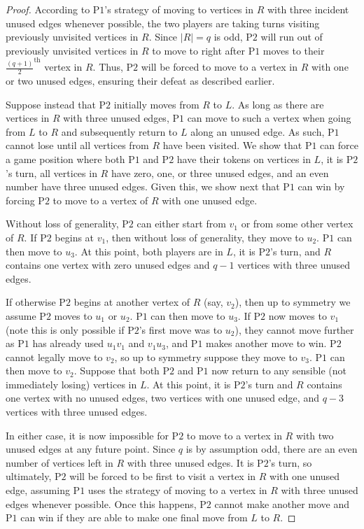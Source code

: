 \documentclass{article}
\theoremstyle{plain}
\theoremstyle{definition}
\def\pone{{\rm{P}\ensuremath{1}}}
\def\ptwo{{\rm{P}\ensuremath{2}}}
\def\ptwoposs{{\rm{P}\ensuremath{2}'s}}
\begin{document}
\begin{proof}
According to \pone{}'s strategy of moving to vertices in $R$ with three incident unused edges whenever possible, the two players are taking turns visiting previously unvisited vertices in $R$. Since $|R| = q$ is odd, \ptwo{} will run out of previously unvisited vertices in $R$ to move to right after \pone{} moves to their $\frac{(q+1)}{2}^{\text{th}}$ vertex in $R$. Thus, \ptwo{} will be forced to move to a vertex in $R$ with one or two unused edges, ensuring their defeat as described earlier.

Suppose instead that \ptwo{} initially moves from $R$ to $L$. As long as there are vertices in $R$ with three unused edges, \pone{} can move to such a vertex when going from $L$ to $R$ and subsequently return to $L$ along an unused edge. As such, \pone{} cannot lose until all vertices from $R$ have been visited. We show that \pone{} can force a game position where both \pone{} and \ptwo{} have their tokens on vertices in $L$, it is \ptwoposs{} turn, all vertices in $R$ have zero, one, or three unused edges, and an even number have three unused edges. Given this, we show next that \pone{} can win by forcing \ptwo{} to move to a vertex of $R$ with one unused edge. 

Without loss of generality, \ptwo{} can either start from $v_1$ or from some other vertex of $R$. If \ptwo{} begins at $v_1$, then without loss of generality, they move to $u_2$. \pone{} can then move to $u_3$. At this point, both players are in $L$, it is \ptwoposs{} turn, and $R$ contains one vertex with zero unused edges and $q-1$ vertices with three unused edges.  

If otherwise \ptwo{} begins at another vertex of $R$ (say, $v_2$), then up to symmetry we assume \ptwo{} moves to $u_1$ or $u_2$. \pone{} can then move to $u_3$. If \ptwo{} now moves to $v_1$ (note this is only possible if \ptwoposs{} first move was to $u_2$), they cannot move further as \pone{} has already used $u_1v_1$ and $v_1u_3$, and \pone{} makes another move to win. \ptwo{} cannot legally move to $v_2$, so up to symmetry suppose they move to $v_3$. \pone{} can then move to $v_2$. Suppose that both \ptwo{} and \pone{} now return to any sensible (not immediately losing) vertices in $L$. At this point, it is \ptwoposs{} turn and $R$ contains one vertex with no unused edges, two vertices with one unused edge, and $q-3$ vertices with three unused edges. 

In either case, it is now impossible for \ptwo{} to move to a vertex in $R$ with two unused edges at any future point. Since $q$ is by assumption odd, there are an even number of vertices left in $R$ with three unused edges. It is \ptwo{}'s turn, so ultimately, \ptwo{} will be forced to be first to visit a vertex in $R$ with one unused edge, assuming \pone{} uses the strategy of moving to a vertex in $R$ with three unused edges whenever possible. Once this happens, \ptwo{} cannot make another move and \pone{} can win if they are able to make one final move from $L$ to $R$.


\end{proof}
\end{document}
